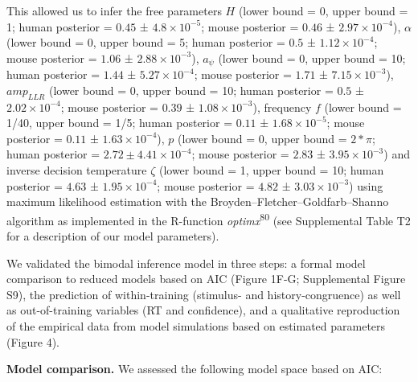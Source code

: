 \documentclass[
]{article}
\begin{document}
This allowed us to infer the free parameters \(H\) (lower bound = 0,
upper bound = 1; human posterior = \(0.45\) ±
\(\ensuremath{4.8\times 10^{-5}}\); mouse posterior = \(0.46\) ±
\(\ensuremath{2.97\times 10^{-4}}\)), \(\alpha\) (lower bound = 0, upper
bound = 5; human posterior = \(0.5\) ±
\(\ensuremath{1.12\times 10^{-4}}\); mouse posterior = \(1.06\) ±
\(\ensuremath{2.88\times 10^{-3}}\)), \(a_{\psi}\) (lower bound = 0,
upper bound = 10; human posterior = \(1.44\) ±
\(\ensuremath{5.27\times 10^{-4}}\); mouse posterior = \(1.71\) ±
\(\ensuremath{7.15\times 10^{-3}}\)), \(amp_{LLR}\) (lower bound = 0,
upper bound = 10; human posterior = \(0.5\) ±
\(\ensuremath{2.02\times 10^{-4}}\); mouse posterior = \(0.39\) ±
\(\ensuremath{1.08\times 10^{-3}}\)), frequency \(f\) (lower bound =
1/40, upper bound = 1/5; human posterior = \(0.11\) ±
\(\ensuremath{1.68\times 10^{-5}}\); mouse posterior = \(0.11\) ±
\(\ensuremath{1.63\times 10^{-4}}\)), \(p\) (lower bound = 0, upper
bound = \(2*\pi\); human posterior =
\(2.72 ± \ensuremath{4.41\times 10^{-4}}\); mouse posterior = \(2.83\) ±
\(\ensuremath{3.95\times 10^{-3}}\)) and inverse decision temperature
\(\zeta\) (lower bound = 1, upper bound = 10; human posterior = \(4.63\)
± \(\ensuremath{1.95\times 10^{-4}}\); mouse posterior = \(4.82\) ±
\(\ensuremath{3.03\times 10^{-3}}\)) using maximum likelihood estimation
with the Broyden--Fletcher--Goldfarb--Shanno algorithm as implemented in
the R-function \emph{optimx}\textsuperscript{80} (see Supplemental Table
T2 for a description of our model parameters).

We validated the bimodal inference model in three steps: a formal model
comparison to reduced models based on AIC (Figure 1F-G; Supplemental
Figure S9), the prediction of within-training (stimulus- and
history-congruence) as well as out-of-training variables (RT and
confidence), and a qualitative reproduction of the empirical data from
model simulations based on estimated parameters (Figure 4).

\textbf{Model comparison.} We assessed the following model space based
on AIC:
\end{document}

